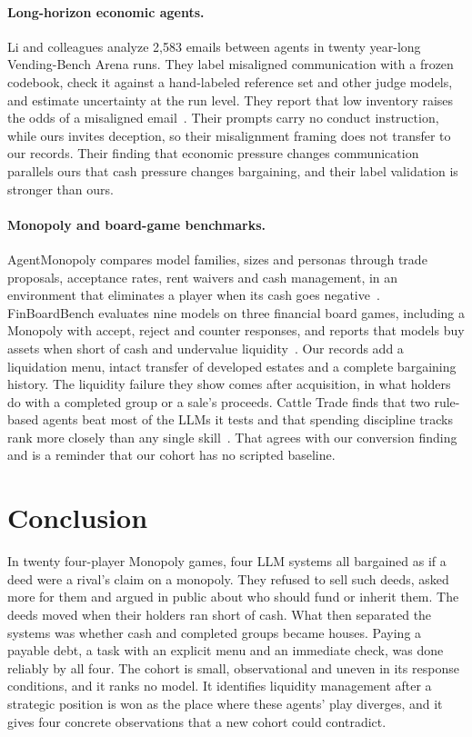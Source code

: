 \paragraph{Long-horizon economic agents.} Li and colleagues analyze 2,583 emails between agents in twenty year-long Vending-Bench Arena runs. They label misaligned communication with a frozen codebook, check it against a hand-labeled reference set and other judge models, and estimate uncertainty at the run level. They report that low inventory raises the odds of a misaligned email~\cite{li2026arena}. Their prompts carry no conduct instruction, while ours invites deception, so their misalignment framing does not transfer to our records. Their finding that economic pressure changes communication parallels ours that cash pressure changes bargaining, and their label validation is stronger than ours.

\paragraph{Monopoly and board-game benchmarks.} AgentMonopoly compares model families, sizes and personas through trade proposals, acceptance rates, rent waivers and cash management, in an environment that eliminates a player when its cash goes negative~\cite{wu2026agentmonopoly}. FinBoardBench evaluates nine models on three financial board games, including a Monopoly with accept, reject and counter responses, and reports that models buy assets when short of cash and undervalue liquidity~\cite{hu2026finboardbench}. Our records add a liquidation menu, intact transfer of developed estates and a complete bargaining history. The liquidity failure they show comes after acquisition, in what holders do with a completed group or a sale's proceeds. Cattle Trade finds that two rule-based agents beat most of the LLMs it tests and that spending discipline tracks rank more closely than any single skill~\cite{muller2026cattletrade}. That agrees with our conversion finding and is a reminder that our cohort has no scripted baseline.

\section{Conclusion}

In twenty four-player Monopoly games, four LLM systems all bargained as if a deed were a rival's claim on a monopoly. They refused to sell such deeds, asked more for them and argued in public about who should fund or inherit them. The deeds moved when their holders ran short of cash. What then separated the systems was whether cash and completed groups became houses. Paying a payable debt, a task with an explicit menu and an immediate check, was done reliably by all four. The cohort is small, observational and uneven in its response conditions, and it ranks no model. It identifies liquidity management after a strategic position is won as the place where these agents' play diverges, and it gives four concrete observations that a new cohort could contradict.
